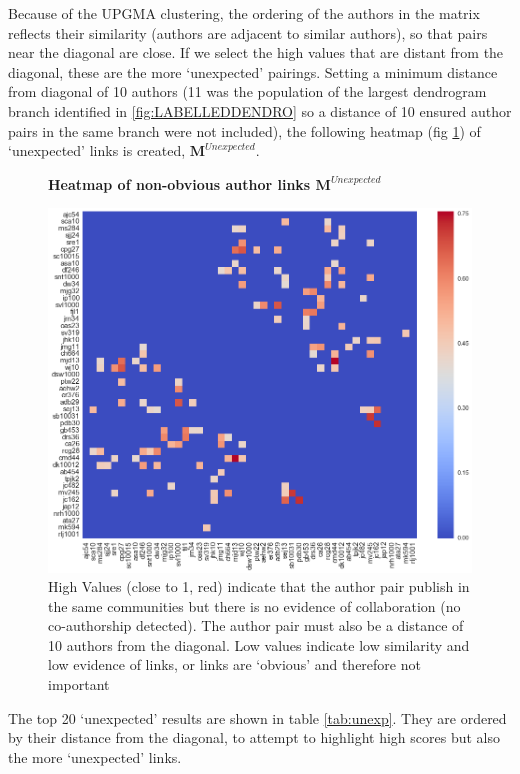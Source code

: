 Because of the UPGMA clustering, the ordering of the authors in the matrix reflects their similarity (authors are adjacent to similar authors), so that pairs near the diagonal are close. If we select the high values that are distant from the diagonal, these are the more `unexpected' pairings. Setting a minimum distance from diagonal of 10 authors (11 was the population of the largest dendrogram branch identified in \ref{fig:LABELLEDDENDRO} so a distance of 10 ensured author pairs in the same branch were not included), the following heatmap (fig \ref{fig:unexpected_links}) of `unexpected' links is created, $\mathbf{M}^{Unexpected}$.
\begin{figure}[H]
    \centering
    \textbf{Heatmap of non-obvious author links $\mathbf{M}^{Unexpected}$}\par\medskip
    \includegraphics[width=\textwidth]{Appendix/Neonicotinoids/Unexpected_Heatmap.png}
    \caption[Heatmap of Non-Obvious Author Links $\mathbf{M}^{Unexpected}$]{High Values (close to 1, red) indicate that the author pair publish in the same communities but there is no evidence of collaboration (no co-authorship detected). The author pair must also be a distance of 10 authors from the diagonal. Low values indicate low similarity and low evidence of links, or links are `obvious' and therefore not important}
     \label{fig:unexpected_links}
\end{figure}
The top 20 `unexpected' results are shown in table \ref{tab:unexp}. They are ordered by their distance from the diagonal, to attempt to highlight high scores but also the more `unexpected' links.
